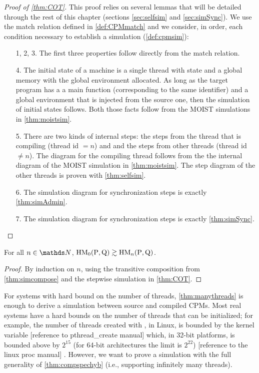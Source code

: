 \begin{proof}[Proof of \cref{thm:COT}] This proof relies on several lemmas that will be detailed through the rest of this chapter (sections \ref{sec:selfsim} and \ref{sec:simSync}). We use the match relation defined in \cref{def:CPMmatch} and we consider, in order, each condition necessary to establish a simulation (\cref{def:cpmsim}):
\begin{enumerate}
\item [1, 2, 3.] The first three properties follow directly from the match relation.  
\item [4.] The initial state of a machine is a single thread with state  and a global memory with the global environment allocated. As long as the target program has a a main function (corresponding to the same identifier) and a global environment that is injected from the source one, then the simulation of initial states follows. Both those facts follow from the MOIST simulations in \cref{thm:moistsim}.
\item [5.] There are two kinds of internal steps: the steps from the thread that is compiling (thread id $ = n$) and and the steps from other threads  (thread id $ \not = n$). 
The diagram for the compiling thread follows from the the internal diagram of the MOIST simulation  in \cref{thm:moistsim}. The step diagram of the other threads is proven with \cref{thm:selfsim}.  
\item [6.] The simulation diagram for synchronization steps is exactly \cref{thm:simAdmin}. 
\item [7.] The simulation diagram for synchronization steps is exactly \cref{thm:simSync}. \qedhere
\end{enumerate}  \end{proof}

\begin{lemma}\label{thm:manythreads} For all  $n\in \nat$,  $\text{HM}_{0}(\text{P},\text{Q}) \gtrsim \text{HM}_{n}(\text{P},\text{Q})$. \end{lemma}
\begin{proof} By induction on $n$, using the transitive composition from \cref{thm:simcompose} and the stepwise simulation in \cref{thm:COT}.
\end{proof}

For systems with hard bound on the number of threads, \cref{thm:manythreads} is enough to derive a simulation between source and compiled CPMs. Most real systems have a hard bounds on the number of threads that can be initialized; for example, the number of threads created with , in Linux, is bounded by the kernel variable  [reference to pthread\_create manual] %
which, in 32-bit platforms, is bounded above by $2^{15}$ (for 64-bit architectures the limit is $2^{22}$) [reference to the linux proc manual]%
. However, we want to prove a simulation with the full generality of \cref{thm:compspechyb} (i.e., supporting infinitely many threads).


